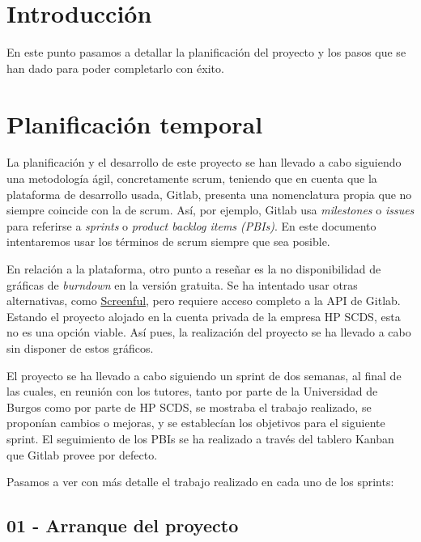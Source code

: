 
\section{Introducción}

En este punto pasamos a detallar la planificación del proyecto y los pasos que se han dado para poder completarlo con éxito.

\section{Planificación temporal}

La planificación y el desarrollo de este proyecto se han llevado a cabo siguiendo una metodología ágil, concretamente scrum, teniendo que en cuenta que la plataforma de desarrollo usada, Gitlab, presenta una nomenclatura propia que no siempre coincide con la de scrum. Así, por ejemplo, Gitlab usa \textit{milestones} o \textit{issues} para referirse a \textit{sprints} o \textit{product backlog items (PBIs)}. En este documento intentaremos usar los términos de scrum siempre que sea posible.

En relación a la plataforma, otro punto a reseñar es la no disponibilidad de gráficas de \textit{burndown} en la versión gratuita. Se ha intentado usar otras alternativas, como \href{https://screenful.com/}{Screenful}, pero requiere acceso completo a la API de Gitlab. Estando el proyecto alojado en la cuenta privada de la empresa HP SCDS, esta no es una opción viable. Así pues, la realización del proyecto se ha llevado a cabo sin disponer de estos gráficos.

El proyecto se ha llevado a cabo siguiendo un sprint de dos semanas, al final de las cuales, en reunión con los tutores, tanto por parte de la Universidad de Burgos como por parte de HP SCDS, se mostraba el trabajo realizado, se proponían cambios o mejoras, y se establecían los objetivos para el siguiente sprint. El seguimiento de los PBIs se ha realizado a través del tablero Kanban que Gitlab provee por defecto.

Pasamos a ver con más detalle el trabajo realizado en cada uno de los sprints:

\subsection{01 - Arranque del proyecto \newline
[10/02/2020 -– 17/02/2020]}

